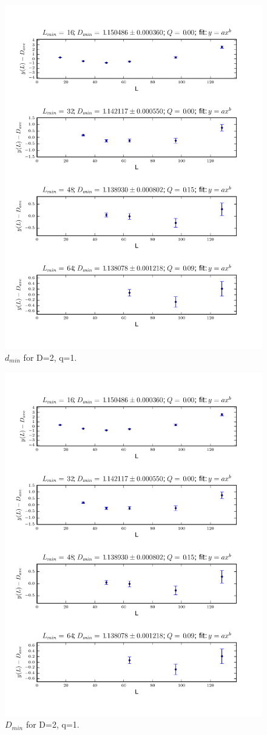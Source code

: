 \documentclass[pre,preprint]{revtex4}
\begin{document}
\begin{figure}[htp]
\centering
\includegraphics[width=.85\textwidth]{figures/d_min_D2q1_46_fig}
\caption{$d_{min}$ for D=2, q=1.}\label{fig:1}
\end{figure}


\begin{figure}[htp]
\centering
\includegraphics[width=.85\textwidth]{figures/D_min_D2q1_46_fig}
\caption{$D_{min}$ for D=2, q=1.}\label{fig:2}
\end{figure}
\end{document}
